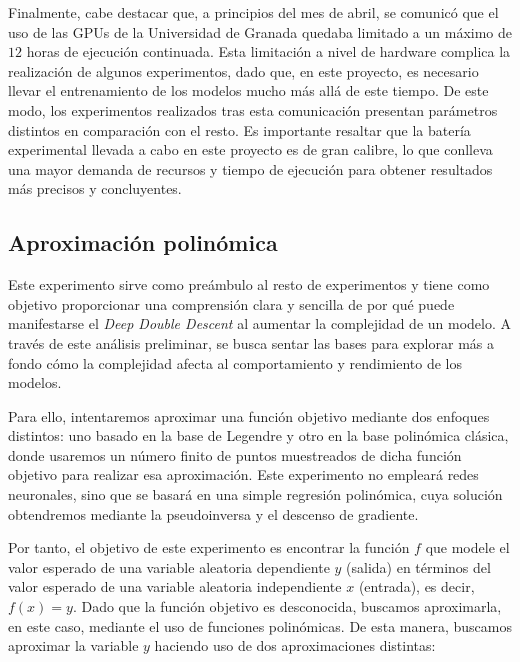 Finalmente, cabe destacar que, a principios del mes de abril, se comunicó que el uso de las GPUs de la Universidad de Granada quedaba limitado a un máximo de $12$ horas de ejecución continuada. Esta limitación a nivel de hardware complica la realización de algunos experimentos, dado que, en este proyecto, es necesario llevar el entrenamiento de los modelos mucho más allá de este tiempo. De este modo, los experimentos realizados tras esta comunicación presentan parámetros distintos en comparación con el resto. Es importante resaltar que la batería experimental llevada a cabo en este proyecto es de gran calibre, lo que conlleva una mayor demanda de recursos y tiempo de ejecución para obtener resultados más precisos y concluyentes.\newline

\subsection{Aproximación polinómica}\label{subsec:approx-polinomica}

Este experimento sirve como preámbulo al resto de experimentos y tiene como objetivo proporcionar una comprensión clara y sencilla de por qué puede manifestarse el \textit{Deep Double Descent} al aumentar la complejidad de un modelo. A través de este análisis preliminar, se busca sentar las bases para explorar más a fondo cómo la complejidad afecta al comportamiento y rendimiento de los modelos.\newline

Para ello, intentaremos aproximar una función objetivo mediante dos enfoques distintos: uno basado en la base de Legendre y otro en la base polinómica clásica, donde usaremos un número finito de puntos muestreados de dicha función objetivo para realizar esa aproximación. Este experimento no empleará redes neuronales, sino que se basará en una simple regresión polinómica, cuya solución obtendremos mediante la pseudoinversa y el descenso de gradiente.\newline

Por tanto, el objetivo de este experimento es encontrar la función $f$ que modele el valor esperado de una variable aleatoria dependiente $y$ (salida) en términos del valor esperado de una variable aleatoria independiente $x$ (entrada), es decir, $f(x)=y$. Dado que la función objetivo es desconocida, buscamos aproximarla, en este caso, mediante el uso de funciones polinómicas. De esta manera, buscamos aproximar la variable $y$ haciendo uso de dos aproximaciones distintas:

